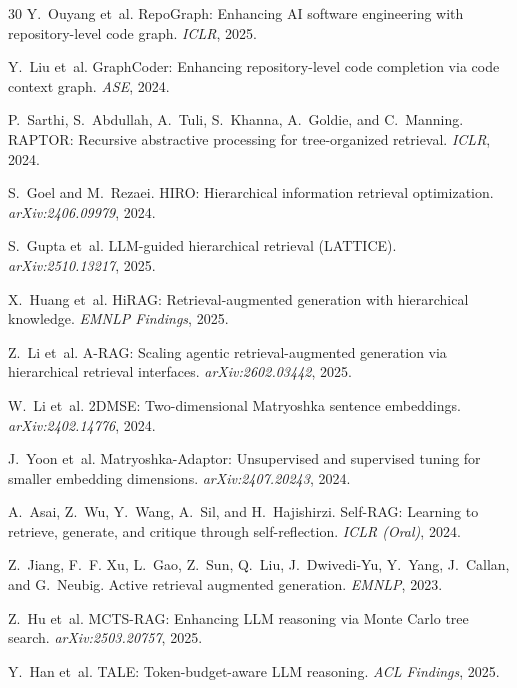 \documentclass[11pt,a4paper]{article}
\begin{document}
\begin{thebibliography}{30}
Y.~Ouyang et~al.
\newblock RepoGraph: Enhancing AI software engineering with repository-level code graph.
\newblock \emph{ICLR}, 2025.

Y.~Liu et~al.
\newblock GraphCoder: Enhancing repository-level code completion via code context graph.
\newblock \emph{ASE}, 2024.

P.~Sarthi, S.~Abdullah, A.~Tuli, S.~Khanna, A.~Goldie, and C.~Manning.
\newblock RAPTOR: Recursive abstractive processing for tree-organized retrieval.
\newblock \emph{ICLR}, 2024.

S.~Goel and M.~Rezaei.
\newblock HIRO: Hierarchical information retrieval optimization.
\newblock \emph{arXiv:2406.09979}, 2024.

S.~Gupta et~al.
\newblock LLM-guided hierarchical retrieval (LATTICE).
\newblock \emph{arXiv:2510.13217}, 2025.

X.~Huang et~al.
\newblock HiRAG: Retrieval-augmented generation with hierarchical knowledge.
\newblock \emph{EMNLP Findings}, 2025.

Z.~Li et~al.
\newblock A-RAG: Scaling agentic retrieval-augmented generation via hierarchical retrieval interfaces.
\newblock \emph{arXiv:2602.03442}, 2025.

W.~Li et~al.
\newblock 2DMSE: Two-dimensional Matryoshka sentence embeddings.
\newblock \emph{arXiv:2402.14776}, 2024.

J.~Yoon et~al.
\newblock Matryoshka-Adaptor: Unsupervised and supervised tuning for smaller embedding dimensions.
\newblock \emph{arXiv:2407.20243}, 2024.

A.~Asai, Z.~Wu, Y.~Wang, A.~Sil, and H.~Hajishirzi.
\newblock Self-RAG: Learning to retrieve, generate, and critique through self-reflection.
\newblock \emph{ICLR (Oral)}, 2024.

Z.~Jiang, F.~F. Xu, L.~Gao, Z.~Sun, Q.~Liu, J.~Dwivedi-Yu, Y.~Yang, J.~Callan, and G.~Neubig.
\newblock Active retrieval augmented generation.
\newblock \emph{EMNLP}, 2023.

Z.~Hu et~al.
\newblock MCTS-RAG: Enhancing LLM reasoning via Monte Carlo tree search.
\newblock \emph{arXiv:2503.20757}, 2025.

Y.~Han et~al.
\newblock TALE: Token-budget-aware LLM reasoning.
\newblock \emph{ACL Findings}, 2025.


\end{thebibliography}
\end{document}
